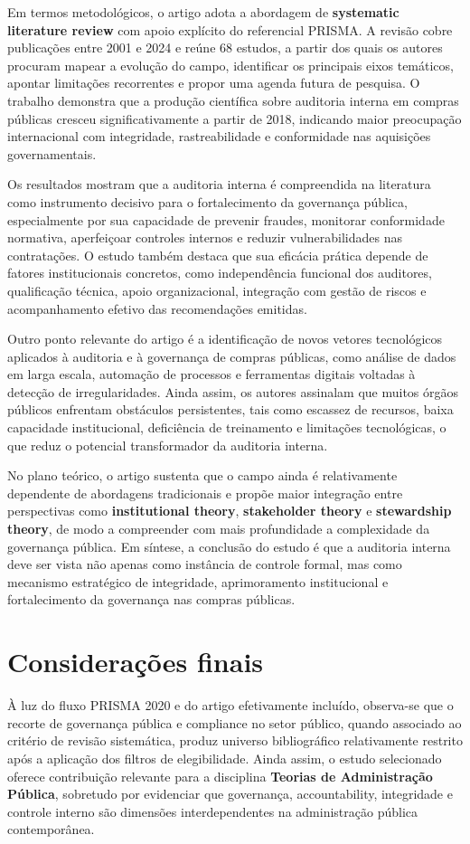 \documentclass[12pt]{article}
\begin{document}
Em termos metodológicos, o artigo adota a abordagem de \textbf{systematic literature review} com apoio explícito do referencial PRISMA. A revisão cobre publicações entre 2001 e 2024 e reúne 68 estudos, a partir dos quais os autores procuram mapear a evolução do campo, identificar os principais eixos temáticos, apontar limitações recorrentes e propor uma agenda futura de pesquisa. O trabalho demonstra que a produção científica sobre auditoria interna em compras públicas cresceu significativamente a partir de 2018, indicando maior preocupação internacional com integridade, rastreabilidade e conformidade nas aquisições governamentais.

Os resultados mostram que a auditoria interna é compreendida na literatura como instrumento decisivo para o fortalecimento da governança pública, especialmente por sua capacidade de prevenir fraudes, monitorar conformidade normativa, aperfeiçoar controles internos e reduzir vulnerabilidades nas contratações. O estudo também destaca que sua eficácia prática depende de fatores institucionais concretos, como independência funcional dos auditores, qualificação técnica, apoio organizacional, integração com gestão de riscos e acompanhamento efetivo das recomendações emitidas.

Outro ponto relevante do artigo é a identificação de novos vetores tecnológicos aplicados à auditoria e à governança de compras públicas, como análise de dados em larga escala, automação de processos e ferramentas digitais voltadas à detecção de irregularidades. Ainda assim, os autores assinalam que muitos órgãos públicos enfrentam obstáculos persistentes, tais como escassez de recursos, baixa capacidade institucional, deficiência de treinamento e limitações tecnológicas, o que reduz o potencial transformador da auditoria interna.

No plano teórico, o artigo sustenta que o campo ainda é relativamente dependente de abordagens tradicionais e propõe maior integração entre perspectivas como \textbf{institutional theory}, \textbf{stakeholder theory} e \textbf{stewardship theory}, de modo a compreender com mais profundidade a complexidade da governança pública. Em síntese, a conclusão do estudo é que a auditoria interna deve ser vista não apenas como instância de controle formal, mas como mecanismo estratégico de integridade, aprimoramento institucional e fortalecimento da governança nas compras públicas.

\section{Considerações finais}
\label{sec:org17b3a51}

À luz do fluxo PRISMA 2020 e do artigo efetivamente incluído, observa-se que o recorte de governança pública e compliance no setor público, quando associado ao critério de revisão sistemática, produz universo bibliográfico relativamente restrito após a aplicação dos filtros de elegibilidade. Ainda assim, o estudo selecionado oferece contribuição relevante para a disciplina \textbf{Teorias de Administração Pública}, sobretudo por evidenciar que governança, accountability, integridade e controle interno são dimensões interdependentes na administração pública contemporânea.
\end{document}
